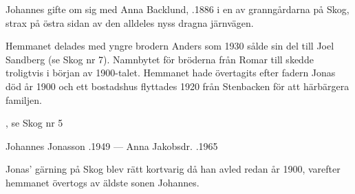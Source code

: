 Johannes gifte om sig med Anna Backlund, .1886 i en av granngårdarna på Skog, strax på östra sidan av den alldeles nyss dragna järnvägen.

Hemmanet delades med yngre brodern Anders som 1930 sålde sin del till Joel Sandberg (se Skog nr 7). Namnbytet för bröderna från Romar till  skedde troligtvis i början av 1900-talet. Hemmanet hade övertagits efter fadern Jonas död år 1900 och ett bostadshus flyttades 1920 från Stenbacken för att härbärgera familjen.

\begin{jhchildren}
  \item {}, se Skog nr 5
  \item {}
  \item {}
  \item {}
\end{jhchildren}

Johannes Jonasson .1949   ---   Anna Jakobsdr. .1965


%
Jonas' gärning på Skog blev rätt kortvarig då han avled redan år 1900, varefter hemmanet övertogs av äldste sonen Johannes.

\begin{jhchildren}
  \item {}
  \item {}
  \item {}
  \item {}
  \item {}
  \item {}
  \item {}
\end{jhchildren}

